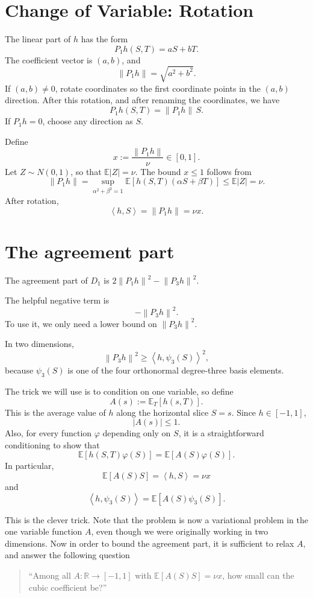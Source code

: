 \documentclass[11pt]{article}
\newcommand{\R}{\mathbb R}
\newcommand{\E}{\mathbb E}
\newcommand{\ip}[2]{\left\langle #1,#2\right\rangle}
\newcommand{\norm}[1]{\left\|#1\right\|}
\begin{document}
\section{Change of Variable: Rotation}

The linear part of $h$ has the form
\[
        P_1h(S,T)=aS+bT.
\]
The coefficient vector is $(a,b)$, and
\[
        \norm{P_1h}=\sqrt{a^2+b^2}.
\]
If $(a,b)\neq0$, rotate coordinates so the first coordinate points in the $(a,b)$ direction. After this rotation, and after renaming the coordinates, we have
\[
        P_1h(S,T)=\norm{P_1h}\,S.
\]
If $P_1h=0$, choose any direction as $S$.

Define
\[
        x:=\frac{\norm{P_1h}}{\nu}\in[0,1].
\]
Let $Z \sim N(0,1)$, so that $\mathbb{E}|Z| = \nu$. The bound $x\le1$ follows from
\[
        \norm{P_1h}=\sup_{\alpha^2+\beta^2=1}\E[h(S,T)(\alpha S+\beta T)]
        \le \E|Z|=\nu.
\]
After rotation,
\[
        \ip{h}{S}=\norm{P_1h}=\nu x.
\]

\section{The agreement part}

The agreement part of $D_1$ is $2\norm{P_1h}^2-\norm{P_3h}^2$.

The helpful negative term is
\[
        -\norm{P_3h}^2.
\]
To use it, we only need a lower bound on $\norm{P_3h}^2$.

In two dimensions,
\[
        \norm{P_3h}^2
        \ge \ip{h}{\psi_3(S)}^2,
\]
because $\psi_3(S)$ is one of the four orthonormal degree-three basis elements.

The trick we will use is to condition on one variable, so define
\[
        A(s):=\E_T[h(s,T)].
\]
This is the average value of $h$ along the horizontal slice $S=s$.  Since $h\in[-1,1]$,
\[
        |A(s)|\le1.
\]
Also, for every function $\varphi$ depending only on $S$, it is a straightforward conditioning to show that 
\[
        \E[h(S,T)\varphi(S)]=\E[A(S)\varphi(S)].
\]
In particular,
\[
        \E[A(S)S]=\ip{h}{S}=\nu x
\]
and
\[
        \ip{h}{\psi_3(S)}=\E[A(S)\psi_3(S)].
\]

This is the clever trick. Note that the problem is now a variational problem in the one variable function $A$, even though we were originally working in two dimensions. Now in order to bound the agreement part, it is sufficient to relax $A$, and answer the following question

\begin{quote}
``Among all $A:\R\to[-1,1]$ with $\E[A(S)S]=\nu x$, how small can the cubic coefficient be?''
\end{quote}
\end{document}
